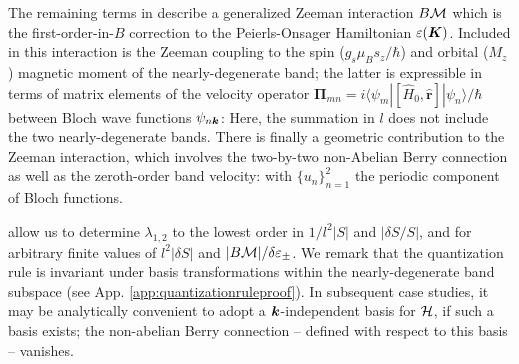 \documentclass[aps, showpacs, twocolumn, notitlepage, superscriptaddress]{revtex4-1}
\begin{document}

The remaining terms in  describe a generalized Zeeman interaction $B{\cal M}$ which is the first-order-in-$B$ correction to the Peierls-Onsager Hamiltonian $\varepsilon(\boldsymbol{K})$\cite{rotheffham,blount_effham,kohn_effham}. Included in this interaction is the Zeeman coupling to the spin ($g_s\mu_Bs_z/\hbar$) and orbital ($M_z$) magnetic moment\cite{thonhauser_orbital_2005} of the nearly-degenerate band; the latter is expressible in terms of matrix elements of the velocity operator $\boldsymbol{\Pi}_{mn}=i\langle\psi_m|[\hat{H}_0, \hat{\boldsymbol{r}}]|\psi_n\rangle/\hbar$ between Bloch wave functions $\psi_{n\boldsymbol{k}}$:
Here, the summation in $l$ does not include the two nearly-degenerate bands.  There is finally a geometric contribution to the Zeeman interaction, which involves the two-by-two non-Abelian Berry connection\cite{berry_quantal_1984,wilczek_appearance_1984} as well as the  zeroth-order band velocity: 
with $\{u_n\}_{n=1}^2$ the periodic component of Bloch functions. 

 allow us to determine $\lambda_{1,2}$ to the lowest order  in $1/l^2|S|$ and $|\delta S/S|$, and for arbitrary finite values of $l^2|\delta S|$ and $|B{\cal M}|/\delta \varepsilon_{\pm}$. We remark that the quantization rule is invariant under basis transformations within the nearly-degenerate band subspace (see App. \ref{app:quantizationruleproof}).  In subsequent case studies, it may be analytically convenient to adopt a $\boldsymbol{k}$-independent basis for ${\cal H}$, if such a basis exists; the non-abelian Berry connection -- defined with respect to this basis -- vanishes.


\end{document}
